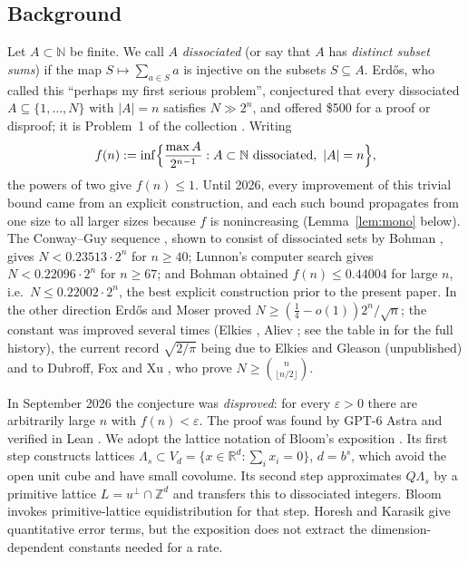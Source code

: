 \documentclass[12pt]{article}
\newcommand{\Z}{\mathbb{Z}}
\newcommand{\R}{\mathbb{R}}
\newcommand{\N}{\mathbb{N}}
\newcommand{\Lat}{\Lambda}
\begin{document}
\subsection{Background}
Let $A\subset\N$ be finite. We call $A$ \emph{dissociated} (or say that $A$ has \emph{distinct subset sums}) if the map
$S\mapsto\sum_{a\in S}a$ is injective on the subsets $S\subseteq A$. Erd\H{o}s, who called this ``perhaps my first serious
problem'', conjectured that every dissociated $A\subseteq\{1,\dots,N\}$ with $|A|=n$ satisfies $N\gg2^n$, and offered
\$500 for a proof or disproof; it is Problem~1 of the collection \cite{EP1}. Writing
\[
 f(n):=\inf\Bigl\{\frac{\max A}{2^{n-1}} : A\subset\N \text{ dissociated},\ |A|=n\Bigr\},
\]
the powers of two give $f(n)\le1$. Until 2026, every improvement of this trivial bound came from an explicit construction, and
each such bound propagates from one size to all larger sizes because $f$ is nonincreasing (Lemma~\ref{lem:mono} below). The
Conway--Guy sequence \cite{CoGu68,Gu82}, shown to consist of dissociated sets by Bohman \cite{Bo96}, gives
$N<0.23513\cdot2^n$ for $n\ge40$; Lunnon's computer search \cite{Lu88} gives $N<0.22096\cdot2^n$ for $n\ge67$; and Bohman
\cite{Bo98} obtained $f(n)\le0.44004$ for large $n$, i.e.\ $N\le0.22002\cdot2^n$, the best explicit construction prior to
the present paper.
In the other direction Erd\H{o}s and Moser \cite{Er56} proved $N\ge(\frac14-o(1))2^n/\sqrt n$; the constant was improved
several times (Elkies \cite{El86}, Aliev \cite{Al08}; see the table in \cite{St23} for the full history), the current
record $\sqrt{2/\pi}$ being due to Elkies and Gleason (unpublished) and to Dubroff, Fox and Xu \cite{DFX21}, who prove
$N\ge\binom{n}{\lfloor n/2\rfloor}$.

In September 2026 the conjecture was \emph{disproved}: for every $\varepsilon>0$ there are arbitrarily large $n$ with
$f(n)<\varepsilon$. The proof was found by GPT-6 Astra and verified in Lean \cite{Ad26}. We adopt the lattice notation
of Bloom's exposition \cite{EP1}. Its first step constructs lattices
$\Lat_s\subset V_d=\{x\in\R^d:\sum_ix_i=0\}$, $d=b^s$, which avoid the open unit cube and have small covolume.
Its second step approximates $Q\Lat_s$ by a primitive lattice $L=u^\perp\cap\Z^d$ and transfers this to dissociated
integers. Bloom invokes primitive-lattice equidistribution for that step. Horesh and Karasik \cite{HoKa23} give
quantitative error terms, but the exposition does not extract the dimension-dependent constants needed for a rate.
\end{document}
